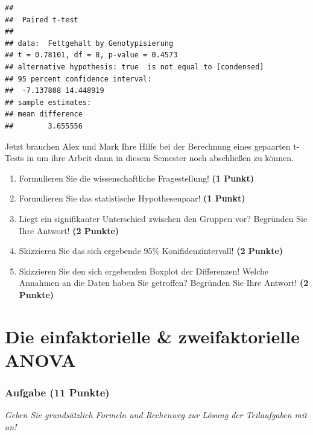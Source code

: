 \documentclass[a4paper, 9pt]{scrartcl}\usepackage[]{graphicx}\usepackage[]{xcolor}
\makeatletter
\newenvironment{kframe}{%
 \def\at@end@of@kframe{}%
 \ifinner\ifhmode%
  \def\at@end@of@kframe{\end{minipage}}%
  \begin{minipage}{\columnwidth}%
 \fi\fi%
 \def\FrameCommand##1{\hskip\@totalleftmargin \hskip-\fboxsep
 \colorbox{shadecolor}{##1}\hskip-\fboxsep
     \hskip-\linewidth \hskip-\@totalleftmargin \hskip\columnwidth}%
 \MakeFramed {\advance\hsize-\width
   \@totalleftmargin\z@ \linewidth\hsize
   \@setminipage}}%
 {\par\unskip\endMakeFramed%
 \at@end@of@kframe}
\newenvironment{knitrout}{}{} %
\makeatother
\begin{document}
\begin{knitrout}
\color{fgcolor}\begin{kframe}
\begin{verbatim}
## 
## 	Paired t-test
## 
## data:  Fettgehalt by Genotypisierung
## t = 0.78101, df = 8, p-value = 0.4573
## alternative hypothesis: true  is not equal to [condensed]
## 95 percent confidence interval:
##  -7.137808 14.448919
## sample estimates:
## mean difference 
##        3.655556
\end{verbatim}
\end{kframe}
\end{knitrout}

Jetzt brauchen Alex und Mark Ihre Hilfe bei der Berechnung eines gepaarten t-Tests in \Rlogo um ihre Arbeit dann in diesem Semester noch abschließen zu können.

\begin{enumerate}
  \item Formulieren Sie die wissenschaftliche Fragestellung! \textbf{(1 Punkt)}
  \item Formulieren Sie das statistische Hypothesenpaar! \textbf{(1 Punkt)}
\item Liegt ein signifikanter Unterschied zwischen den Gruppen vor?
  Begründen Sie Ihre Antwort! \textbf{(2 Punkte)}
\item Skizzieren Sie das sich ergebende 95\% Konifidenzintervall! \textbf{(2 Punkte)}
\item Skizzieren Sie den sich ergebenden Boxplot der Differenzen! Welche Annahmen an die Daten haben Sie getroffen? Begründen Sie Ihre Antwort! \textbf{(2 Punkte)} 
\end{enumerate}
 
\clearpage
\part{Die einfaktorielle \& zweifaktorielle ANOVA}

\section{Aufgabe \hfill (11 Punkte)}

\textit{Geben Sie grundsätzlich Formeln und Rechenweg zur Lösung der Teilaufgaben mit an!} \\[1Ex]
 
\end{document}
